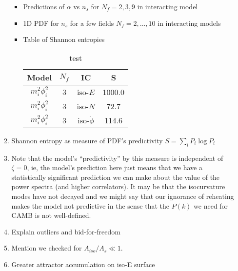 \documentclass[a4paper,11pt]{article}
\begin{document}
\begin{enumerate}
\begin{enumerate}
\begin{itemize}
          \item Predictions of $\alpha$ vs $n_s$ for $N_f=2,3,9$ in interacting model

          \item 1D PDF for $n_s$ for a few fields $N_f=2,\dots,10$ in interacting models

          \item Table of Shannon entropies


            \begin{table}
              \centering
              \begin{tabular}{| c  c  c  c |}
                \hline
                Model & $N_f$ & IC & S \\
                \hline
                $m_i^2 \phi_i^2$            & 3 & iso-$E$ & 1000.0 \\
                $m_i^2 \phi_i^2$            & 3 & iso-$N$ & 72.7   \\
                $m_i^2 \phi_i^2$            & 3 & iso-$\dot \phi$ & 114.6  \\
                \hline
              \end{tabular}
              \caption{test}
              \label{table:ratio}
            \end{table}

        \end{itemize}

      \item Shannon entropy as measure of PDF's predictivity $S = \sum_i P_i \log P_i$

      \item Note that the model's ``predictivity'' by this measure is independent of $\dot \zeta =0$, ie, the model's prediction here just means that we have a statistically significant prediction we can make about the value of the power spectra (and higher correlators).  It may be that the isocurvature modes have not decayed and we might say that our ignorance of reheating makes the model not predictive in the sense that the $P(k)$ we need for CAMB is not well-defined.

      \item Explain outliers and bid-for-freedom

      \item Mention we checked for $A_{iso}/A_s \ll 1$.

      \item Greater attractor accumulation on iso-E surface

    \end{enumerate}


\end{enumerate}
\end{document}
